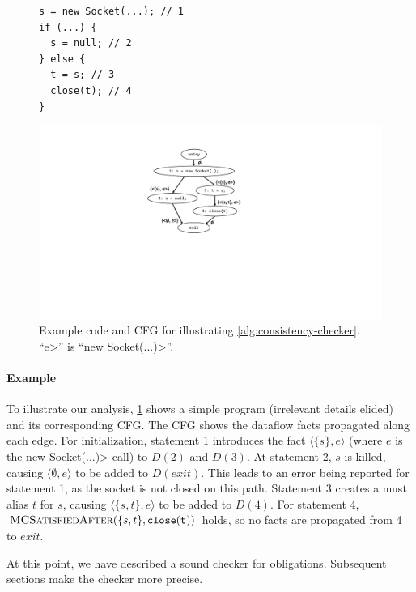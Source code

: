 \begin{figure}
  \begin{minipage}{0.4\columnwidth}
    \begin{lstlisting}
s = new Socket(...); // 1
if (...) {
  s = null; // 2
} else {
  t = s; // 3
  close(t); // 4
}
\end{lstlisting}
  \end{minipage}
  \begin{minipage}{0.55\columnwidth}
  \includegraphics[width=\linewidth,keepaspectratio]{cfg-example.pdf}
  \end{minipage}
  \prefigcaption
  \caption{Example code and CFG for illustrating \cref{alg:consistency-checker}.
    ``\<e>'' is ``\<new Socket(...)>''.
} \label{fig:cfg-example}
\end{figure}

\paragraph{Example} To illustrate our analysis, \cref{fig:cfg-example} shows a
simple program (irrelevant details elided) and its corresponding CFG.
The CFG shows the dataflow facts propagated along each edge.
For initialization, statement 1 introduces the fact $\langle \{ s \}, e
\rangle$ (where $e$ is the \<new Socket(...)> call) to $D(2)$ and $D(3)$.  At
statement 2, $s$ is killed, causing $\langle \emptyset , e \rangle$ to be added
to $D(\mathit{exit})$.  This leads to an error being reported for statement 1, as
the socket is not closed on this path.  Statement 3 creates a must alias $t$ for
$s$, causing $\langle \{ s, t \}, e \rangle$ to be added to $D(4)$.  For
statement 4, $\textsc{MCSatisfiedAfter}(\{s,t\},\mathtt{close(t)})$ holds, so no
facts are propagated from 4 to $\mathit{exit}$.

At this point, we have described a sound checker for \MustCall obligations.
Subsequent sections make the checker more precise.

